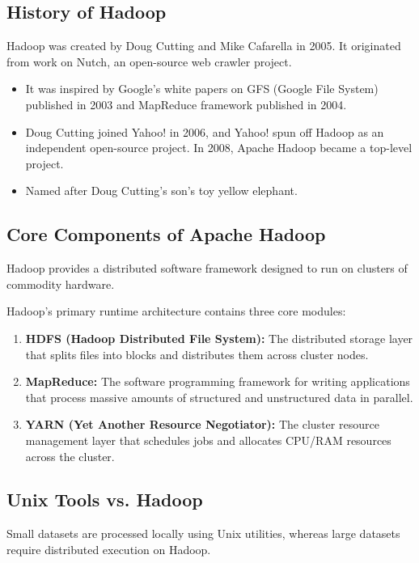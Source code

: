 \documentclass[12pt,a4paper]{article}
\begin{document}
\subsection{History of Hadoop}
Hadoop was created by Doug Cutting and Mike Cafarella in 2005. It originated from work on Nutch, an open-source web crawler project.
\begin{itemize}[leftmargin=*, itemsep=3pt]
  \item It was inspired by Google's white papers on GFS (Google File System) published in 2003 and MapReduce framework published in 2004.
  \item Doug Cutting joined Yahoo! in 2006, and Yahoo! spun off Hadoop as an independent open-source project. In 2008, Apache Hadoop became a top-level project.
  \item Named after Doug Cutting's son's toy yellow elephant.
\end{itemize}

\subsection{Core Components of Apache Hadoop}
Hadoop provides a distributed software framework designed to run on clusters of commodity hardware.

\begin{tcolorbox}[formulabox, title={Core Hadoop Modules}]
  Hadoop's primary runtime architecture contains three core modules:
  \begin{enumerate}[leftmargin=*, noitemsep]
    \item \textbf{HDFS (Hadoop Distributed File System):} The distributed storage layer that splits files into blocks and distributes them across cluster nodes.
    \item \textbf{MapReduce:} The software programming framework for writing applications that process massive amounts of structured and unstructured data in parallel.
    \item \textbf{YARN (Yet Another Resource Negotiator):} The cluster resource management layer that schedules jobs and allocates CPU/RAM resources across the cluster.
  \end{enumerate}
\end{tcolorbox}

\subsection{Unix Tools vs. Hadoop}
Small datasets are processed locally using Unix utilities, whereas large datasets require distributed execution on Hadoop.
\end{document}
